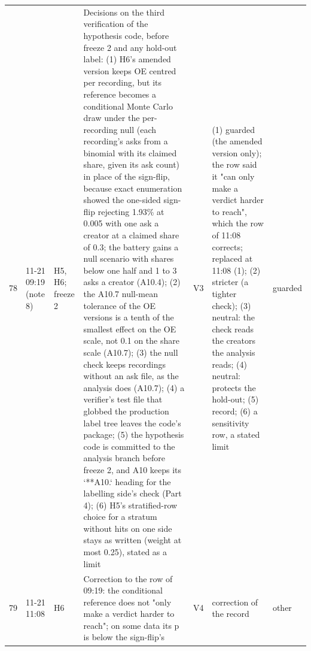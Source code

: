 {\begin{tabular}{@{}rp{}p{}p{}p{}p{}l@{}}
78 & 11-21 09:19 (note 8) & H5, H6; freeze 2 & Decisions on the third verification of the hypothesis code, before freeze 2 and any hold-out label: (1) H6's amended version keeps OE centred per recording, but its reference becomes a conditional Monte Carlo draw under the per-recording null (each recording's asks from a binomial with its claimed share, given its ask count) in place of the sign-flip, because exact enumeration showed the one-sided sign-flip rejecting 1.93\% at 0.005 with one ask a creator at a claimed share of 0.3; the battery gains a null scenario with shares below one half and 1 to 3 asks a creator (A10.4); (2) the A10.7 null-mean tolerance of the OE versions is a tenth of the smallest effect on the OE scale, not 0.1 on the share scale (A10.7); (3) the null check keeps recordings without an ask file, as the analysis does (A10.7); (4) a verifier's test file that globbed the production label tree leaves the code's package; (5) the hypothesis code is committed to the analysis branch before freeze 2, and A10 keeps its `**A10.` heading for the labelling side's check (Part 4); (6) H5's stratified-row choice for a stratum without hits on one side stays as written (weight at most 0.25), stated as a limit & V3 & (1) guarded (the amended version only); the row said it "can only make a verdict harder to reach", which the row of 11:08 corrects; replaced at 11:08 (1); (2) stricter (a tighter check); (3) neutral: the check reads the creators the analysis reads; (4) neutral: protects the hold-out; (5) record; (6) a sensitivity row, a stated limit & guarded \\
79 & 11-21 11:08 & H6 & Correction to the row of 09:19: the conditional reference does not "only make a verdict harder to reach"; on some data its p is below the sign-flip's & V4 & correction of the record & other \\
\bottomrule
\end{tabular}}

